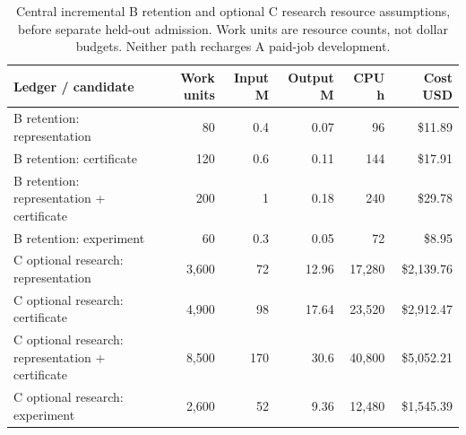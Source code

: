 \begin{table}[!htbp]\centering\small
\caption{Central incremental B retention and optional C research resource assumptions, before separate held-out admission. Work units are resource counts, not dollar budgets. Neither path recharges A paid-job development.}
\begin{tabularx}{\linewidth}{Yrrrrr}\toprule
Ledger / candidate & Work units & Input M & Output M & CPU h & Cost USD\\\midrule
B retention: representation & 80 & 0.4 & 0.07 & 96 & \$11.89\\
B retention: certificate & 120 & 0.6 & 0.11 & 144 & \$17.91\\
B retention: representation + certificate & 200 & 1 & 0.18 & 240 & \$29.78\\
B retention: experiment & 60 & 0.3 & 0.05 & 72 & \$8.95\\
C optional research: representation & 3,600 & 72 & 12.96 & 17,280 & \$2,139.76\\
C optional research: certificate & 4,900 & 98 & 17.64 & 23,520 & \$2,912.47\\
C optional research: representation + certificate & 8,500 & 170 & 30.6 & 40,800 & \$5,052.21\\
C optional research: experiment & 2,600 & 52 & 9.36 & 12,480 & \$1,545.39\\
\bottomrule
\end{tabularx}
\par{}\par
\end{table}
